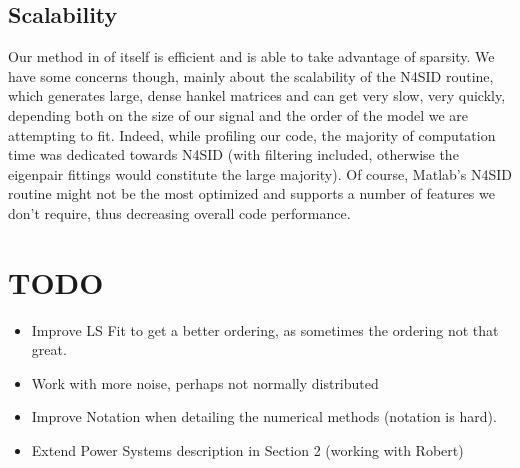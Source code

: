 \subsection{Scalability}
Our method in of itself is efficient and is able to take advantage of sparsity. We have some concerns though, mainly about the scalability of the N4SID routine, which generates large, dense hankel matrices and can get very slow, very quickly, depending both on the size of our signal and the order of the model we are attempting to fit. Indeed, while profiling our code, the majority of computation time was dedicated towards N4SID (with filtering included, otherwise the eigenpair fittings would constitute the large majority). Of course, Matlab's N4SID routine might not be the most optimized and supports a number of features we don't require, thus decreasing overall code performance. 



\section{TODO}
\begin{itemize}
    \item Improve LS Fit to get a better ordering, as sometimes the ordering not that great. 
    \item Work with more noise, perhaps not normally distributed 
    \item Improve Notation when detailing the numerical methods (notation is hard).
    \item Extend Power Systems description in Section 2 (working with Robert) 
\end{itemize}

